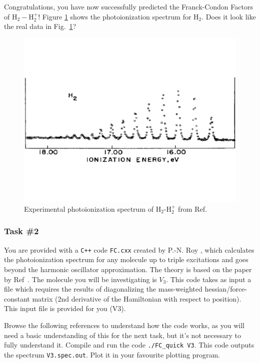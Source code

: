 \documentclass[12pt]{article}
\begin{document}
Congratulations, you have now successfully predicted the Franck-Condon Factors of H$_2-$H$_2^+$! Figure \ref{fig:h2_spectrum} shows the photoionization spectrum for H$_2$. Does it look like the real data in Fig.~\ref{fig:h2_spectrum}?

\begin{figure}
    \begin{center}
        \includegraphics[width=\linewidth]{../figures/H2-expspectrum.pdf}
    \end{center}
    \caption{
    Experimental photoionization spectrum of H$_2$-H$_2^+$ from Ref.~\cite{berkowitz1973comparison}
    }
    \label{fig:h2_spectrum}
\end{figure}

\subsubsection*{Task \#2}

You are provided with a \texttt{C++} code \texttt{FC.cxx} created by P.-N. Roy \cite{yang1995structure}, which calculates the photoionization spectrum for any molecule up to triple excitations and goes beyond the harmonic oscillator approximation. The theory is based on the paper by Ref~\cite{doktorov1977dynamical}. The molecule you will be investigating is $V_3$.
This code takes as input a file which requires the results of diagonalizing the mass-weighted hessian/force-constant matrix (2nd derivative of the Hamiltonian with respect to position). This input file is provided for you (V3).

Browse the following references to understand how the code works, as you will need a basic understanding of this for the next task, but it's not necessary to fully understand it. Compile and run the code \texttt{./FC\_quick V3}. This code outputs the spectrum \texttt{V3.spec.out}. Plot it in your favourite plotting program. 
\end{document}
